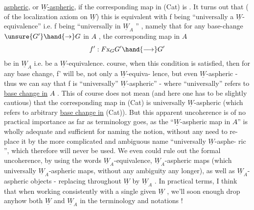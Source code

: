 
\uline{aspheric}, or \uline{$\underline{W}$-aspheric}, if the corresponding map in (Cat) is . It
\margin{|}turns out that  ( of the localization axiom on $\underline{W}$) this
is equivalent with f being ``universally a $\underline{W}$-equivalence'' i.e. f being
``universally in $\underline{W}_A$ '' , namely that for any base-change $\unsure{G'}\hand{\to}G$ in $A\hat{}$ ,
the corresponding map in $A\hat{}$
\[ f' : F\mathrm{x}_G G' \hand{\longrightarrow} G' \]
be in $\underline{W}_A$ i.e. be a $\underline{W}$-equivalence.  course, when this condition is
satisfied, then for any base change, f' will be, not only a $\underline{W}$-equiva-%
lence, but even $\underline{W}$-aspheric - thus we can say that f is ``universally''
$\underline{W}$-aspheric'' - where ``universally'' refers to \uline{base change in} $A\hat{}$ . This of
course does not mean (and here one has to be slightly cautious) that
the corresponding map in (Cat) is universally $\underline{W}$-aspheric (which 
refers to arbitrary \uline{base change in} (Cat)). But this 
apparent uncoherence is of no practical importance as far as terminology
goes, as the  ``$\underline{W}$-aspheric map in $A\hat{}$''  is wholly 
adequate and sufficient for naming the notion, without any need to re-%
place it by the more complicated and ambiguous name ``universally $\underline{W}$-asphe-%
ric '', which therefore will never be used. We even could rule out the
formal uncoherence, by using the words $\underline{W}_A$-equivalence, $\underline{W}_A$-aspheric
maps (which  universally $\underline{W}_A$-aspheric maps, without any ambiguity
any longer), as well as $\underline{W}_A$-aspheric objects - replacing throughout $\underline{W}$
by $\underline{W}_A$ . In practical terms, I think that when working consistently with
a single given $\underline{W}$ , we'll soon enough drop anyhow both $\underline{W}$ and $\underline{W}_A$ in the
terminology and notations !

